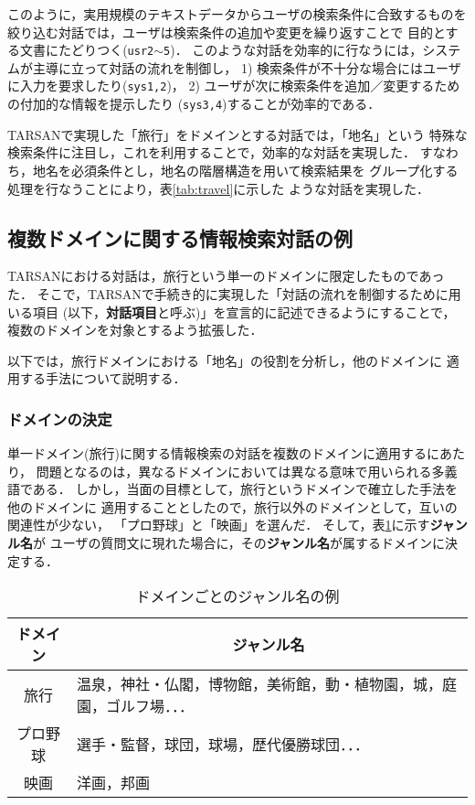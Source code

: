 このように，実用規模のテキストデータからユーザの検索条件に合致するものを
絞り込む対話では，ユーザは検索条件の追加や変更を繰り返すことで
目的とする文書にたどりつく({\tt usr2$\sim$5})．
このような対話を効率的に行なうには，システムが主導に立って対話の流れを制御し，
1) 検索条件が不十分な場合にはユーザに入力を要求したり({\tt sys1,2})，
2) ユーザが次に検索条件を追加／変更するための付加的な情報を提示したり
({\tt sys3,4})することが効率的である．

TARSANで実現した「旅行」をドメインとする対話では，「地名」という
特殊な検索条件に注目し，これを利用することで，効率的な対話を実現した．
すなわち，地名を必須条件とし，地名の階層構造を用いて検索結果を
グループ化する処理を行なうことにより，表\ref{tab:travel}に示した
ような対話を実現した．

\subsection{複数ドメインに関する情報検索対話の例}

TARSANにおける対話は，旅行という単一のドメインに限定したものであった．
そこで，TARSANで手続き的に実現した「対話の流れを制御するために用いる項目
(以下，{\bf 対話項目}と呼ぶ)」を宣言的に記述できるようにすることで，
複数のドメインを対象とするよう拡張した．

以下では，旅行ドメインにおける「地名」の役割を分析し，他のドメインに
適用する手法について説明する．

\subsubsection{ドメインの決定}

単一ドメイン(旅行)に関する情報検索の対話を複数のドメインに適用するにあたり，
問題となるのは，異なるドメインにおいては異なる意味で用いられる多義語である．
しかし，当面の目標として，旅行というドメインで確立した手法を他のドメインに
適用することとしたので，旅行以外のドメインとして，互いの関連性が少ない，
「プロ野球\cite{baseball}」と「映画\cite{cinema}」を選んだ．
そして，表\ref{tab:genre}に示す{\bf ジャンル名}が
ユーザの質問文に現れた場合に，その{\bf ジャンル名}が属するドメインに決定する．

\begin{table}[th]
\caption{ドメインごとのジャンル名の例}\label{tab:genre}
\bigskip
\centering
\begin{tabular}{c|l}\hline\hline
{\bf ドメイン}& \multicolumn{1}{c}{\bf ジャンル名}\\
\hline
旅行 & 温泉，神社・仏閣，博物館，美術館，動・植物園，城，庭園，ゴルフ場．．．\\
プロ野球 & 選手・監督，球団，球場，歴代優勝球団．．．\\
映画 & 洋画，邦画\\
\hline\hline
\end{tabular}
\end{table}

